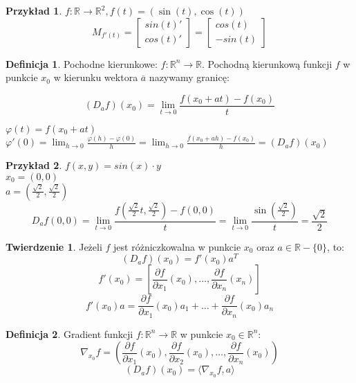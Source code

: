 \documentclass{article}
\theoremstyle{definition}
\newtheorem{de}{Definicja}[subsection]
\theoremstyle{definition}
\newtheorem{tw}{Twierdzenie}[subsection]
\theoremstyle{definition}
\newtheorem{pk}{Przykład}[subsection]
\theoremstyle{definition}
\theoremstyle{definition}
\theoremstyle{definition}
\theoremstyle{definition}
\begin{document}
\begin{pk}
    $f:\mathbb{R}\rightarrow \mathbb{R}^2, f(t)=(\sin(t),\cos(t))$\\
    $$
    M_{f'(t)} = \left[
        \begin{matrix}
        sin(t)'\\
        cos(t)'
        \end{matrix}
    \right]=\left[
        \begin{matrix}
            cos(t)\\
            -sin(t)
        \end{matrix}
    \right]
    $$
\end{pk}

\begin{de}
    Pochodne kierunkowe: $f: \mathbb{R}^n\rightarrow \mathbb{R}$. 
    Pochodną kierunkową funkcji $f$ w punkcie $x_0$ 
    w kierunku wektora $\overline{a}$ nazywamy granicę:
    \begin{center}
        \[(D_a f)(x_0)=\lim_{t\rightarrow 0} \frac{f(x_0 + at) - f(x_0)}{t}\]
    \end{center}
    $\varphi(t)=f(x_0+at)$\\
    $\varphi'(0)=\lim_{h\rightarrow 0} \frac{\varphi(h)-\varphi(0)}{h}=\lim_{h\rightarrow 0} \frac{f(x_0+ah)-f(x_0)}{h}=(D_a f)(x_0)$
\end{de}

\begin{pk}
    $f(x,y) = sin(x)\cdot y$\\
    $x_0 = (0,0)$\\
    $a=(\frac{\sqrt{2}}{2},\frac{\sqrt{2}}{2})$\\
    \[D_a f (0,0) = \lim_{t\rightarrow 0} \frac{f\left(\frac{\sqrt{2}}{2}t,\frac{\sqrt{2}}{2}\right)-f(0,0)}{t}=\lim_{t\rightarrow 0} \frac{\sin(\frac{\sqrt{2}}{2})}{t}=\frac{\sqrt{2}}{2}\]
\end{pk}

\begin{tw}
    Jeżeli $f$ jest różniczkowalna w punkcie $x_0$ oraz $a\in\mathbb{R}-\{0\}$, to:
    \[(D_a f)(x_0) = f'(x_0) a^{T}\]
    \[f'(x_0)=\left[\frac{\partial f}{\partial x_1} (x_0),\dots,\frac{\partial f}{\partial x_n} (x_n)\right]\]
    \[f'(x_0)a = \frac{\partial f}{\partial x_1}(x_0)a_1 + \dots + \frac{\partial f}{\partial x_n} (x_0) a_n\]
\end{tw}

\begin{de}
    Gradient funkcji $f: \mathbb{R}^n\rightarrow\mathbb{R}$ w punkcie $x_0\in\mathbb{R}^n$:
    \[\nabla_{x_0} f = \left(\frac{\partial f}{\partial x_1} (x_0), \frac{\partial f}{\partial x_2} (x_0),\dots, \frac{\partial f}{\partial x_n} (x_0)\right)\]
    \[(D_a f) (x_0) = \langle \nabla_{x_0} f, a \rangle\]
\end{de}
\end{document}
